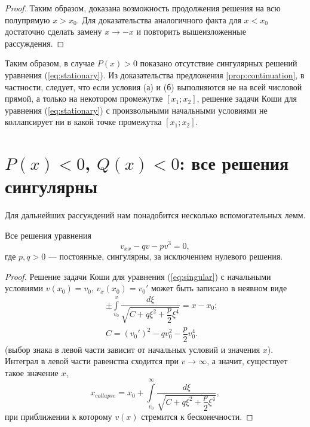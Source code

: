 \begin{proof}
Таким образом, доказана возможность продолжения решения на всю полупрямую $x > x_0$.
Для доказательства аналогичного факта для $x < x_0$ достаточно сделать замену $x \to -x$ и повторить вышеизложенные рассуждения.
\end{proof}

Таким образом, в случае $P(x) > 0$ показано отсутствие сингулярных решений уравнения (\ref{eq:stationary}).
Из доказательства предложения \ref{prop:continuation}, в частности, следует, что если условия (а) и (б) выполняются не на всей числовой прямой, а только на некотором промежутке $[x_1;x_2]$, решение задачи Коши для уравнения (\ref{eq:stationary}) с произвольными начальными условиями не коллапсирует ни в какой точке промежутка $[x_1;x_2]$.

\section{$P(x) < 0$, $Q(x) < 0$: все решения сингулярны}

Для дальнейших рассуждений нам понадобится несколько вспомогательных лемм.

\begin{lemma}
Все решения уравнения
%
\begin{equation}
v_{xx} - qv - pv^3 = 0,
\label{eq:singular}
\end{equation}
%
где $p,q > 0$ --- постоянные, сингулярны, за исключением нулевого решения.
\label{lemma:singular}
\end{lemma}
%
\begin{proof}
Решение задачи Коши для уравнения (\ref{eq:singular}) с начальными условиями $v(x_0) = v_0$, $v_x(x_0) = v_0'$ может быть записано в неявном виде
%
\begin{eqnarray*}
&&\pm {\int \limits_{v_0}^{v} \dfrac{d\xi}{\sqrt{C + q{\xi}^2 + \dfrac{p}{2}{\xi}^4}}} = x - x_0; \\
&& C = (v_0')^2 - qv_0^2 - \dfrac{p}{2}v_0^4.
\end{eqnarray*}
%
(выбор знака в левой части зависит от начальных условий и значения $x$).
Интеграл в левой части равенства сходится при $v \to \infty$, а значит, существует такое значение $x$,
%
\begin{equation}
x_{collapse} = x_0 + {\int \limits_{v_0}^{\infty} \dfrac{d\xi}{\sqrt{C + q{\xi}^2 + \dfrac{p}{2}{\xi}^4}}},
\end{equation}
%
при приближении к которому $v(x)$ стремится к бесконечности.
\end{proof}

